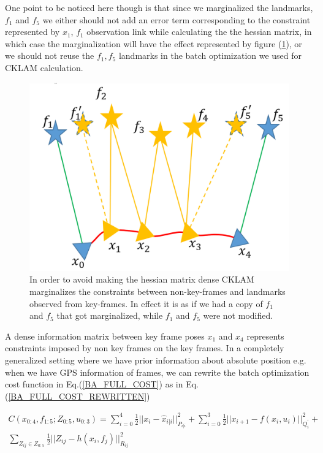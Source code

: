 One point to be noticed here though is that since we marginalized the landmarks, $f_1$ and $f_5$ we either should not add an error term corresponding to the constraint represented by $x_1$, $f_1$ observation link while calculating the the hessian matrix, in which case the marginalization will have the effect represented by figure (\ref{fig:CKLAMMarginalizationFeatureClone}), or we should not reuse the $f_1, f_5$ landmarks in the batch optimization we used for CKLAM calculation. 

\begin{figure}[ht]
	\centering
		\includegraphics[width=1.00\textwidth]{images/CKLAMMarginalizationFeatureClone.png}
  \caption{In order to avoid making the hessian matrix dense CKLAM marginalizes the constraints between non-key-frames and landmarks observed from key-frames. In effect it is as if we had a copy of $f_1$ and $f_5$ that got marginalized, while $f_1$ and $f_5$ were not modified. \cite{CKLAM}}
  \label{fig:CKLAMMarginalizationFeatureClone}
\end{figure}

A dense information matrix between key frame poses $x_1$ and $x_4$ represents constraints imposed by non key frames on the key frames. In a completely generalized setting where we have prior information about absolute position e.g. when we have GPS information of frames, we can rewrite the batch optimization cost function in Eq.(\ref{BA_FULL_COST}) as in Eq.(\ref{BA_FULL_COST_REWRITTEN})

\begin{equation}
  \begin{split}
    C(x_{0:4},f_{1:5};Z_{0:5},u_{0:3}) = \sum_{i=0}^4 \frac{1}{2}||x_i-\hat x_{i|i}||^2_{P_{i|i}} + \sum_{i=0}^3 {\frac{1}{2}||x_{i+1} - f(x_i, u_i)||^2_{Q_i^{'}}} +\\ \sum_{Z_{ij}\in Z_{0:5}} {\frac{1}{2}||Z_{ij}-h(x_i,f_j)||^2_{R_{ij}}}
    \label{BA_FULL_COST_REWRITTEN}
  \end{split}
\end{equation}

